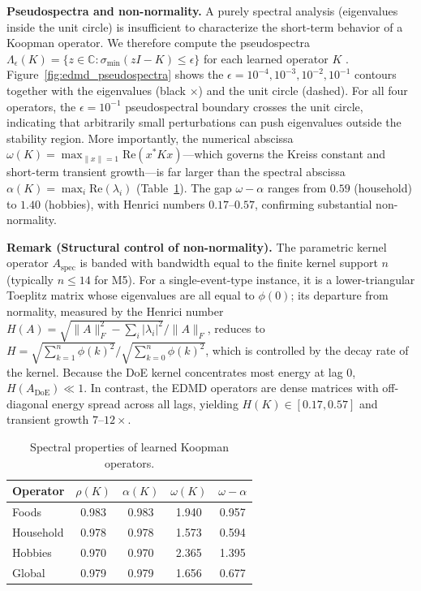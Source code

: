 \documentclass[10pt]{article} %
\theoremstyle{plain}
\theoremstyle{definition}
\begin{document}
\textbf{Pseudospectra and non-normality.} A purely spectral analysis (eigenvalues inside the unit circle) is insufficient to characterize the short-term behavior of a Koopman operator. We therefore compute the pseudospectra $\Lambda_{\epsilon}(K) = \{z \in \mathbb{C} : \sigma_{\min}(zI - K) \leq \epsilon\}$ for each learned operator $K$ \citep{TrefethenEmbree2005}. Figure~\ref{fig:edmd_pseudospectra} shows the $\epsilon = 10^{-4}, 10^{-3}, 10^{-2}, 10^{-1}$ contours together with the eigenvalues (black $\times$) and the unit circle (dashed). For all four operators, the $\epsilon = 10^{-1}$ pseudospectral boundary crosses the unit circle, indicating that arbitrarily small perturbations can push eigenvalues outside the stability region. More importantly, the numerical abscissa $\omega(K) = \max_{\|x\|=1} \text{Re}(x^* K x)$---which governs the Kreiss constant and short-term transient growth---is far larger than the spectral abscissa $\alpha(K) = \max_i \text{Re}(\lambda_i)$ (Table~\ref{tab:edmd_spectral}). The gap $\omega - \alpha$ ranges from $0.59$ (household) to $1.40$ (hobbies), with Henrici numbers $0.17$--$0.57$, confirming substantial non-normality.

\textbf{Remark (Structural control of non-normality).} The parametric kernel operator $A_{\text{spec}}$ is banded with bandwidth equal to the finite kernel support $n$ (typically $n \leq 14$ for M5). For a single-event-type instance, it is a lower-triangular Toeplitz matrix whose eigenvalues are all equal to $\phi(0)$; its departure from normality, measured by the Henrici number $H(A) = \sqrt{\|A\|_F^2 - \sum_i|\lambda_i|^2}/\|A\|_F$, reduces to $H = \sqrt{\sum_{k=1}^n \phi(k)^2} / \sqrt{\sum_{k=0}^n \phi(k)^2}$, which is controlled by the decay rate of the kernel. Because the DoE kernel concentrates most energy at lag 0, $H(A_{\text{DoE}}) \ll 1$. In contrast, the EDMD operators are dense matrices with off-diagonal energy spread across all lags, yielding $H(K) \in [0.17, 0.57]$ and transient growth $7$--$12\times$.


\begin{table}[ht]
\centering
\caption{Spectral properties of learned Koopman operators.}
\label{tab:edmd_spectral}
\begin{tabular}{lcccc}
\toprule
Operator & $\rho(K)$ & $\alpha(K)$ & $\omega(K)$ & $\omega - \alpha$ \\
\midrule
Foods & 0.983 & 0.983 & 1.940 & 0.957 \\
Household & 0.978 & 0.978 & 1.573 & 0.594 \\
Hobbies & 0.970 & 0.970 & 2.365 & 1.395 \\
Global & 0.979 & 0.979 & 1.656 & 0.677 \\
\bottomrule
\end{tabular}
\end{table}
\end{document}

